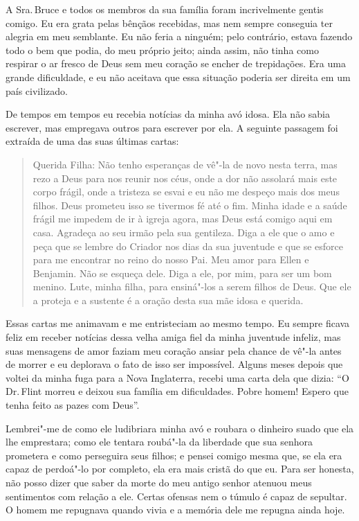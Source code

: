 A Sra.\,Bruce e todos os membros da sua
família foram incrivelmente gentis comigo. Eu era grata pelas bênçãos
recebidas, mas nem sempre conseguia ter alegria em meu semblante. Eu não
feria a ninguém; pelo contrário, estava fazendo todo o bem que podia, do
meu próprio jeito; ainda assim, não tinha como respirar o ar fresco de
Deus sem meu coração se encher de trepidações. Era uma grande
dificuldade, e eu não aceitava que essa situação poderia ser direita em
um país civilizado.

De tempos em tempos eu recebia notícias
da minha avó idosa. Ela não sabia escrever, mas empregava outros para
escrever por ela. A seguinte passagem foi extraída de uma das suas
últimas cartas:

\begin{quote}
Querida Filha: Não tenho esperanças de vê"-la de novo nesta terra, mas
rezo a Deus para nos reunir nos céus, onde a dor não assolará mais este
corpo frágil, onde a tristeza se esvai e eu não me despeço mais dos meus
filhos. Deus prometeu isso se tivermos fé até o fim. Minha idade e a
saúde frágil me impedem de ir à igreja agora, mas Deus está comigo aqui
em casa. Agradeça ao seu irmão pela sua gentileza. Diga a ele que o amo
e peça que se lembre do Criador nos dias da sua juventude e que se
esforce para me encontrar no reino do nosso Pai. Meu amor para Ellen e
Benjamin. Não se esqueça dele. Diga a ele, por mim, para ser um bom
menino. Lute, minha filha, para ensiná"-los a serem filhos de Deus. Que
ele a proteja e a sustente é a oração desta sua mãe idosa e querida.
\end{quote}

Essas cartas me animavam e me
entristeciam ao mesmo tempo. Eu sempre ficava feliz em receber notícias
dessa velha amiga fiel da minha juventude infeliz, mas suas mensagens de
amor faziam meu coração ansiar pela chance de vê"-la antes de morrer e eu
deplorava o fato de isso ser impossível. Alguns meses depois que voltei
da minha fuga para a Nova Inglaterra, recebi uma carta dela que dizia:
``O Dr.\,Flint morreu e deixou sua família em dificuldades. Pobre homem!
Espero que tenha feito as pazes com Deus''.

Lembrei"-me de como ele ludibriara minha
avó e roubara o dinheiro suado que ela lhe emprestara; como ele tentara
roubá"-la da liberdade que sua senhora prometera e como perseguira seus
filhos; e pensei comigo mesma que, se ela era capaz de perdoá"-lo por
completo, ela era mais cristã do que eu. Para ser honesta, não posso
dizer que saber da morte do meu antigo senhor atenuou meus sentimentos
com relação a ele. Certas ofensas nem o túmulo é capaz de sepultar. O
homem me repugnava quando vivia e a memória dele me repugna ainda hoje.


